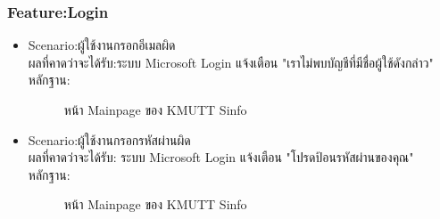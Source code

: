 \documentclass[14pt,oneside,openright,a4paper]{cpe-thai-project}
\begin{document}
\subsubsection{Feature:Login}
\begin{itemize}
  \item Scenario:ผู้ใช้งานกรอกอีเมลผิด\\ผลที่คาดว่าจะได้รับ:ระบบ Microsoft Login แจ้งเตือน "เราไม่พบบัญชีที่มีชื่อผู้ใช้ดังกล่าว"\\หลักฐาน:\\
  \begin{figure}[!h]\centering
    \setlength{\fboxrule}{0.5mm} %
    \setlength{\fboxsep}{0.5cm}
    \caption{หน้า Mainpage ของ KMUTT Sinfo}\label{fig:sinfo}
  \end{figure}
\end{itemize}
\newpage
\begin{itemize}
  \item Scenario:ผู้ใช้งานกรอกรหัสผ่านผิด\\ผลที่คาดว่าจะได้รับ: ระบบ Microsoft Login แจ้งเตือน "โปรดป้อนรหัสผ่านของคุณ"\\หลักฐาน:\\
  \begin{figure}[!h]\centering
    \setlength{\fboxrule}{0.5mm} %
    \setlength{\fboxsep}{0.5cm}
    \caption{หน้า Mainpage ของ KMUTT Sinfo}\label{fig:sinfo}
  \end{figure}
\end{itemize}
\newpage
\end{document}
